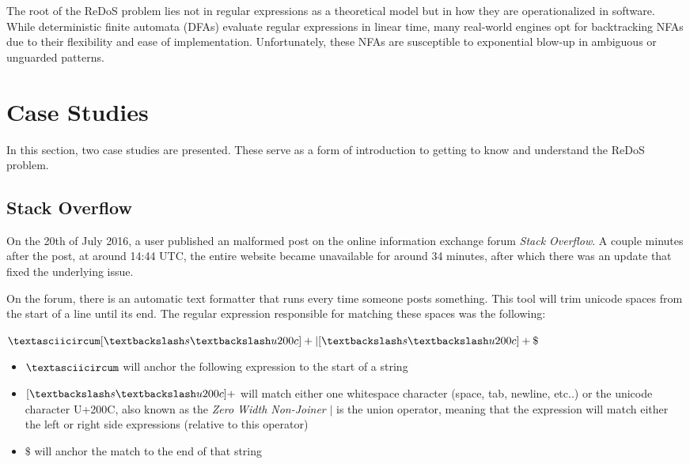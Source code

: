The root of the ReDoS problem lies not in regular expressions as a theoretical model but in how they are operationalized in software. While deterministic finite automata (DFAs) evaluate regular expressions in linear time, many real-world engines opt for backtracking NFAs due to their flexibility and ease of implementation. Unfortunately, these NFAs are susceptible to exponential blow-up in ambiguous or unguarded patterns.

\section{Case Studies}
In this section, two case studies are presented. These serve as a form of introduction to getting to know and understand the ReDoS problem.

\subsection{Stack Overflow}
\label{intro:case_studies:stack_overflow}
On the 20th of July 2016, a user published an malformed post on the online information exchange forum \textit{Stack Overflow}. A couple minutes after the post, at around 14:44 UTC, the entire website became unavailable for around 34 minutes, after which there was an update that fixed the underlying issue.

On the forum, there is an automatic text formatter that runs every time someone posts something. This tool will trim unicode spaces from the start of a line until its end. The regular expression responsible for matching these spaces was the following:

\begin{center}
	$\textasciicircum [ \textbackslash s \textbackslash u200c]+|[ \textbackslash s \textbackslash u200c]+\$$
\end{center}

\begin{itemize}
	\item \textbf{$\textasciicircum$} will anchor the following expression to the start of a string
	\item \textbf{$[ \textbackslash s \textbackslash u200c]+$} will match either one whitespace character (space, tab, newline, etc..) or the unicode character U+200C, also known as the \textit{Zero Width Non-Joiner}
	\textit \textbf{$|$} is the union operator, meaning that the expression will match either the left or right side expressions (relative to this operator)
	\item \textbf{$\$$} will anchor the match to the end of that string
\end{itemize}


